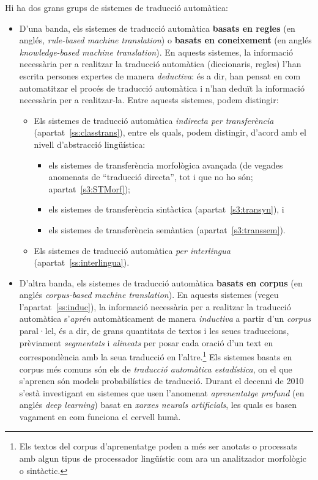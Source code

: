 Hi ha dos grans grups de sistemes de traducció automàtica:
\begin{itemize}
\item D'una banda, els sistemes de traducció automàtica \textbf{basats
    en regles} (en anglés, \emph{rule-based machine translation}) o
  \textbf{basats en coneixement} (en anglés \emph{knowledge-based
    machine translation}). En aquests sistemes, la informació
  necessària per a realitzar la traducció automàtica (diccionaris,
  regles) l'han escrita persones expertes de manera \emph{deductiva}:
  és a dir, han pensat en com automatitzar el procés de traducció
  automàtica i n'han deduït la informació necessària per a
  realitzar-la. Entre aquests sistemes, podem distingir:
  \begin{itemize}
  \item Els sistemes de traducció automàtica \emph{indirecta per
      transferència} (apartat~\ref{ss:classtrans}), entre els quals,
    podem distingir, d'acord amb el nivell d'abstracció lingüística:
    \begin{itemize}
    \item els sistemes de transferència morfològica avançada (de
      vegades anomenats de ``traducció directa'', tot i que no ho són;
      apartat~\ref{s3:STMorf});
    \item els sistemes de transferència sintàctica
      (apartat~\ref{s3:transyn}), i
    \item els sistemes de transferència semàntica
      (apartat~\ref{s3:transsem}).
    \end{itemize}
  \item Els sistemes de traducció automàtica \emph{per interlingua}
    (apartat~\ref{ss:interlingua}).
  \end{itemize}
\item D'altra banda, els sistemes de traducció automàtica
  \textbf{basats en corpus} (en anglés \emph{corpus-based machine
    translation}). En aquests sistemes (vegeu
  l'apartat~\ref{ss:induc}), la informació necessària per a realitzar
  la traducció automàtica s'\emph{aprén} automàticament de manera
  \emph{inductiva} a partir d'un \emph{corpus} paral·lel, és a dir, de
  grans quantitats de textos i les seues traduccions, prèviament
  \emph{segmentats} i \emph{alineats} per posar cada oració d'un text
  en correspondència amb la seua traducció en l'altre.\footnote{Els
    textos del corpus d'aprenentatge poden a més ser anotats o
    processats amb algun tipus de processador lingüístic com ara un
    analitzador morfològic o sintàctic.} Els sistemes basats en corpus
  més comuns són els de \emph{traducció automàtica estadística}, on el
  que s'aprenen són models probabilístics de traducció. Durant el
  decenni de 2010 s'està investigant en sistemes que usen l'anomenat
  \emph{aprenentatge profund} (en anglés \emph{deep learning}) basat
  en \emph{xarxes neurals artificials}, les quals es basen vagament en
  com funciona el cervell humà. 
\end{itemize}


